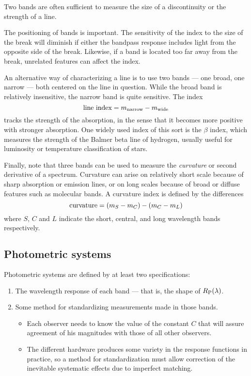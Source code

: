 \documentclass{article}
\begin{document}
Two bands are often sufficient to measure the size of a discontinuity
or the strength of a line. 

The positioning of bands is important. The sensitivity of the index to
the size of the break will diminish if either the bandpass response
includes light from the opposite side of the break. Likewise, if a
band is located too far away from the break, unrelated features can
affect the index. 

An alternative way of characterizing a line is to use two bands ---
one broad, one narrow --- both centered on the line in question. While
the broad band is relatively insensitive, the narrow band is quite
sensitive. The index
\[
{\rm line~index}=m_{\rm narrow}-m_{\rm wide}
\]
tracks the strength of the absorption, in the sense that it becomes
more positive with stronger absorption. One widely used index of this
sort is the $\beta$ index, which measures the strength of the Balmer
beta line of hydrogen, usually useful for luminosity or temperature
classification of stars. 

Finally, note that three bands can be used to measure the {\it
  curvature} or second derivative of a spectrum. Curvature can arise
on relatively short scale because of sharp absorption or emission
lines, or on long scales because of broad or diffuse features such as
molecular bands. A curvature index is defined by the differences
\[
{\rm curvature}=(m_S-m_C)-(m_C-m_L)
\]
where $S$, $C$ and $L$ indicate the short, central, and long
wavelength bands respectively.

\subsection{Photometric systems}

Photometric systems are defined by at least two specifications:
\begin{enumerate}
\item The wavelength response of each band --- that is, the shape of
  $R_{\rm P}(\lambda)$.
\item Some method for standardizing measurements made in those bands. 
\begin{itemize}
\item Each observer needs to know the value of the constant $C$ that
  will assure agreement of his magnitudes with those of all other
  observers.
\item The different hardware produces some variety in the response
  functions in practice, so a method for standardization must allow
  correction of the inevitable systematic effects due to imperfect matching.
\end{itemize}
\end{enumerate}
\end{document}
